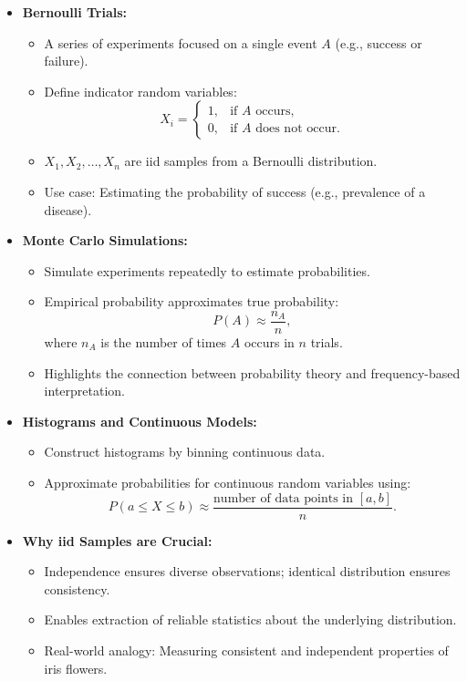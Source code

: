 \documentclass{article}
\begin{document}
\begin{itemize}
  \item \textbf{Bernoulli Trials:}
    \begin{itemize}
      \item A series of experiments focused on a single event $A$ (e.g., success or failure).
      \item Define indicator random variables:
        \[
          X_i =
          \begin{cases}
            1, & \text{if } A \text{ occurs}, \\
            0, & \text{if } A \text{ does not occur}.
          \end{cases}
        \]
      \item $X_1, X_2, \dots, X_n$ are iid samples from a Bernoulli distribution.
      \item Use case: Estimating the probability of success (e.g., prevalence of a disease).
    \end{itemize}

  \item \textbf{Monte Carlo Simulations:}
    \begin{itemize}
      \item Simulate experiments repeatedly to estimate probabilities.
      \item Empirical probability approximates true probability:
        \[
          P(A) \approx \frac{n_A}{n},
        \]
        where $n_A$ is the number of times $A$ occurs in $n$ trials.
      \item Highlights the connection between probability theory and frequency-based interpretation.
    \end{itemize}

  \item \textbf{Histograms and Continuous Models:}
    \begin{itemize}
      \item Construct histograms by binning continuous data.
      \item Approximate probabilities for continuous random variables using:
        \[
          P(a \leq X \leq b) \approx \frac{\text{number of data points in } [a, b]}{n}.
        \]
    \end{itemize}

  \item \textbf{Why iid Samples are Crucial:}
    \begin{itemize}
      \item Independence ensures diverse observations; identical distribution ensures consistency.
      \item Enables extraction of reliable statistics about the underlying distribution.
      \item Real-world analogy: Measuring consistent and independent properties of iris flowers.
    \end{itemize}


\end{itemize}
\end{document}
